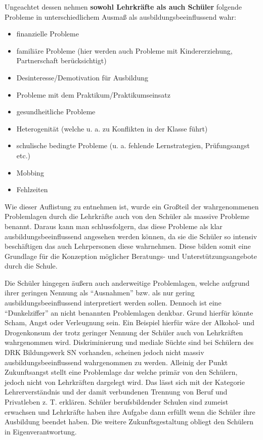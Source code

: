 \noindent
Ungeachtet dessen nehmen \textbf{sowohl Lehrkräfte als auch Schüler} folgende Probleme in unterschiedlichem Ausmaß als ausbildungsbeeinflussend wahr: 
\begin{itemize}
	\item finanzielle Probleme
	\item familiäre Probleme (hier werden auch Probleme mit Kindererziehung, Partnerschaft berücksichtigt)
	\item Desinteresse/Demotivation für Ausbildung
	\item Probleme mit dem Praktikum/Praktikumseinsatz
	\item gesundheitliche Probleme
	\item Heterogenität (welche u. a. zu Konflikten in der Klasse führt)
	\item schulische bedingte Probleme (u. a. fehlende Lernstrategien, Prüfungsangst etc.)
	\item Mobbing
	\item Fehlzeiten
\end{itemize}

\noindent
Wie dieser Auflistung zu entnehmen ist, wurde ein Großteil der wahrgenommenen Problemlagen durch die Lehrkräfte auch von den Schüler als massive Probleme benannt. Daraus kann man schlussfolgern, das diese Probleme als klar ausbildungsbeeinflussend angesehen werden können, da sie die Schüler so intensiv beschäftigen das auch Lehrpersonen diese wahrnehmen. Diese bilden somit eine Grundlage für die Konzeption möglicher Beratungs- und Unterstützungsangebote durch die Schule.

Die Schüler hingegen äußern auch anderweitige Problemlagen, welche aufgrund ihrer geringen Nennung als "`Ausnahmen"' bzw. als nur gering ausbildungsbeeinflussend interpretiert werden sollen. Dennoch ist eine "`Dunkelziffer"' an nicht benannten Problemlagen denkbar. Grund hierfür könnte Scham, Angst oder Verleugnung sein. Ein Beispiel hierfür wäre der Alkohol- und Drogenkonsum der trotz geringer Nennung der Schüler auch von Lehrkräften wahrgenommen wird. Diskriminierung und mediale Süchte sind bei Schülern des DRK Bildungswerk SN vorhanden, scheinen jedoch nicht massiv ausbildungsbeeinflussend wahrgenommen zu werden. Alleinig der Punkt Zukunftsangst stellt eine Problemlage dar welche primär von den Schülern, jedoch nicht von Lehrkräften dargelegt wird. Das lässt sich mit der Kategorie Lehrerverständnis und der damit verbundenen Trennung von Beruf und Privatleben z. T. erklären. Schüler berufsbildender Schulen sind zumeist erwachsen und Lehrkräfte haben ihre Aufgabe dann erfüllt wenn die Schüler ihre Ausbildung beendet haben. Die weitere Zukunftsgestaltung obliegt den Schülern in Eigenverantwortung.

